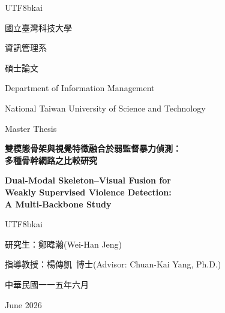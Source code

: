\begin{titlepage}
  \centering
  \begin{CJK}{UTF8}{bkai}
  \vspace*{1.5cm}
  {\fontsize{18}{22}\selectfont 國立臺灣科技大學\par}
  \vspace{0.2cm}
  {\fontsize{18}{22}\selectfont 資訊管理系\par}
  \vspace{0.2cm}
  {\fontsize{18}{22}\selectfont 碩士論文\par}

  \vspace{0.8cm}
  {\large Department of Information Management\par}
  {\large National Taiwan University of Science and Technology\par}
  {\large Master Thesis\par}

  \vspace{2.2cm}
  {\fontsize{20}{26}\selectfont\bfseries
   雙模態骨架與視覺特徵融合於弱監督暴力偵測：\\[0.3em]
   多種骨幹網路之比較研究\par}
  \end{CJK}

  \vspace{1.0cm}
  {\fontsize{24}{29}\selectfont\bfseries Dual-Modal Skeleton--Visual Fusion for\\[0.4em]
   Weakly Supervised Violence Detection:\\[0.4em]
   A Multi-Backbone Study\par}

  \vfill
  \begin{CJK}{UTF8}{bkai}
  {\large 研究生：鄭暐瀚\quad(Wei-Han Jeng)\par}
  \vspace{0.4cm}
  {\large 指導教授：楊傳凱\ 博士\quad(Advisor: Chuan-Kai Yang, Ph.D.)\par}

  \vspace{1.4cm}
  {\large 中華民國一一五年六月\par}
  \vspace{0.2cm}
  {\large June 2026\par}
  \end{CJK}
\end{titlepage}
